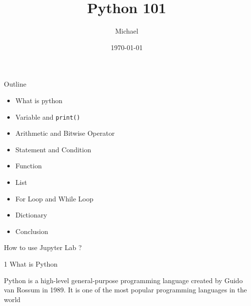 \documentclass{beamer}
\title{Python 101}
\author{Michael}
\date{\today}
\begin{document}
    \begin{frame}[plain]
        \maketitle
    \end{frame}

    \begin{frame}
        \color{blue} \Large Outline  \\
        \color{black} \normalsize \vskip 10pt 
        \begin{itemize}
            \item What is python
            \item Variable and \texttt{print()}
            \item Arithmetic and Bitwise Operator
            \item Statement and Condition
            \item Function
            \item List
            \item For Loop and While Loop
            \item Dictionary
            \item Conclusion
        \end{itemize}
    \end{frame}

    \begin{frame}
        \begin{center}
            {\color{blue} \LARGE How to use Jupyter Lab ?}
        \end{center}
    \end{frame}

    \begin{frame}[plain]
        \begin{center}
            {\color{blue} \LARGE 1 What is Python}
        \end{center}
    \end{frame}

    \begin{frame}
        Python is a high-level general-purpose programming language created by Guido
        van Rossum in 1989. It is one of the most popular programming languages in the world
    \end{frame}
\end{document}
